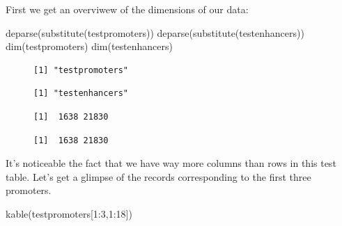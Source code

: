 \documentclass[
  letterpaper,
  DIV=11,
  numbers=noendperiod]{scrartcl}
\newenvironment{Shaded}{\begin{snugshade}}{\end{snugshade}}
\newcommand{\DecValTok}[1]{\textcolor[rgb]{0.68,0.00,0.00}{#1}}
\newcommand{\FunctionTok}[1]{\textcolor[rgb]{0.28,0.35,0.67}{#1}}
\newcommand{\NormalTok}[1]{\textcolor[rgb]{0.00,0.23,0.31}{#1}}
\newcommand{\SpecialCharTok}[1]{\textcolor[rgb]{0.37,0.37,0.37}{#1}}
\begin{document}
First we get an overviwew of the dimensions of our data:

\begin{Shaded}
\begin{Highlighting}[]
\FunctionTok{deparse}\NormalTok{(}\FunctionTok{substitute}\NormalTok{(testpromoters))}
\FunctionTok{deparse}\NormalTok{(}\FunctionTok{substitute}\NormalTok{(testenhancers))}
\FunctionTok{dim}\NormalTok{(testpromoters)}
\FunctionTok{dim}\NormalTok{(testenhancers)}
\end{Highlighting}
\end{Shaded}

\begin{figure}

\begin{minipage}{0.50\linewidth}

\begin{verbatim}
[1] "testpromoters"
\end{verbatim}

\end{minipage}%
%
\begin{minipage}{0.50\linewidth}

\begin{verbatim}
[1] "testenhancers"
\end{verbatim}

\end{minipage}%
\newline
\begin{minipage}{0.50\linewidth}

\begin{verbatim}
[1]  1638 21830
\end{verbatim}

\end{minipage}%
%
\begin{minipage}{0.50\linewidth}

\begin{verbatim}
[1]  1638 21830
\end{verbatim}

\end{minipage}%

\end{figure}%

It's noticeable the fact that we have way more columns than rows in this
test table. Let's get a glimpse of the records corresponding to the
first three promoters.

\begin{Shaded}
\begin{Highlighting}[]
\FunctionTok{kable}\NormalTok{(testpromoters[}\DecValTok{1}\SpecialCharTok{:}\DecValTok{3}\NormalTok{,}\DecValTok{1}\SpecialCharTok{:}\DecValTok{18}\NormalTok{])}
\end{Highlighting}
\end{Shaded}
\end{document}
